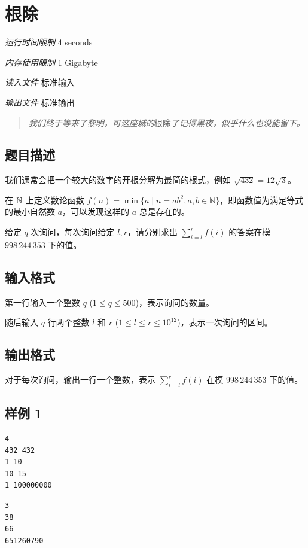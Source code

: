 \section[E. 根除]{ 根除}

\textit{运行时间限制}   4 seconds

\textit{内存使用限制} 1 Gigabyte

\textit{读入文件} \qquad 标准输入

\textit{输出文件} \qquad 标准输出


\begin{quote}
	\textit{我们终于等来了黎明，可这座城的}根除\textit{了记得黑夜，似乎什么也没能留下。}
\end{quote}

\subsection{题目描述}

我们通常会把一个较大的数字的开根分解为最简的根式，例如 $\sqrt{432} = 12 \sqrt3$。

在 $\mathbb{N}$ 上定义数论函数 $f(n) = \min\{a \mid n = ab^2, a, b \in \mathbb{N}\}$，即函数值为满足等式的最小自然数 $a$，可以发现这样的 $a$ 总是存在的。

给定 $q$ 次询问，每次询问给定 $l, r$，请分别求出 $\sum_{i=l}^r f(i)$ 的答案在模 $998\,244\,353$ 下的值。

\subsection{输入格式}

第一行输入一个整数 $q$ ($1 \le q \le 500$)，表示询问的数量。

随后输入 $q$ 行两个整数 $l$ 和 $r$ ($1 \le l \le r \le 10^{12}$)，表示一次询问的区间。

\subsection{输出格式}

对于每次询问，输出一行一个整数，表示 $\sum_{i=l}^r f(i)$ 在模 $998\,244\,353$ 下的值。

\subsection{样例 1}

\begin{minipage}{\linewidth}
	\begin{minipage}[t]{0.49\linewidth}
		\begin{lstlisting}[title=\texttt{standard input}]
4
432 432
1 10
10 15
1 100000000
\end{lstlisting}
	\end{minipage}
	\begin{minipage}[t]{0.49\linewidth}
		\begin{lstlisting}[title=\texttt{standard output}]
3
38
66
651260790
\end{lstlisting}
	\end{minipage}
\end{minipage}


